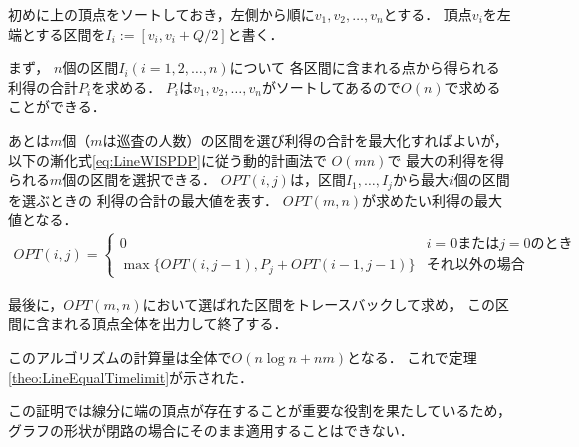 初めに{\graphLine}上の頂点をソートしておき，左側から順に$v_1,v_2,\ldots,v_n$とする．
頂点$v_i$を左端とする区間を$I_i := [v_i, v_i + Q/2]$と書く．

まず，
$n$個の区間$I_i (i = 1,2,\ldots, n)$について
各区間に含まれる点から得られる利得の合計$P_i$を求める．
$P_i$は$v_1,v_2,\ldots,v_n$がソートしてあるので$O(n)$で求めることができる．

あとは$m$個（$m$は巡査の人数）の区間を選び利得の合計を最大化すればよいが，
以下の漸化式\ref{eq:LineWISPDP}に従う動的計画法で
$O(mn)$で
最大の利得を得られる$m$個の区間を選択できる．
$OPT(i,j)$は，区間$I_1, \ldots, I_j$から最大$i$個の区間を選ぶときの
利得の合計の最大値を表す．
$OPT(m,n)$が求めたい利得の最大値となる．
\begin{align}
  \label{eq:LineWISPDP}
  OPT(i,j) = 
  \begin{cases}
    0 & \text{$i = 0$または$j = 0$のとき} \\
    \max \{
      OPT(i, j - 1), 
      P_j + OPT(i - 1, j - 1)
    \}
    & \text{それ以外の場合}
  \end{cases}
\end{align}

最後に，$OPT(m,n)$において選ばれた区間をトレースバックして求め，
この区間に含まれる頂点全体を出力して終了する．

このアルゴリズムの計算量は全体で$O(n \log n + nm)$となる．
これで定理\ref{theo:LineEqualTimelimit}が示された．


この証明では線分に端の頂点が存在することが重要な役割を果たしているため，
グラフの形状が閉路の場合にそのまま適用することはできない．
